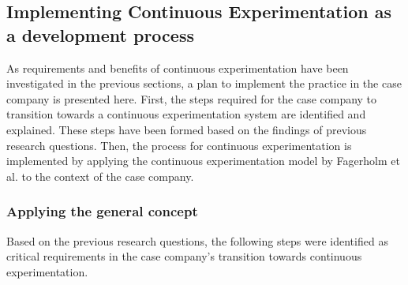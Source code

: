 \documentclass[english]{tktltiki2}
\theoremstyle{definition}
\theoremstyle{remark}
\begin{document}


\subsection{Implementing Continuous Experimentation as a development process}
As requirements and benefits of continuous experimentation have been investigated in the previous sections, a plan to implement the practice in the case company is presented here. First, the steps required for the case company to transition towards a continuous experimentation system are identified and explained. These steps have been formed based on the findings of previous research questions. Then, the process for continuous experimentation is implemented by applying the continuous experimentation model by Fagerholm et al. \cite{fagerholm2014building} to the context of the case company. 
\subsubsection{Applying the general concept}


Based on the previous research questions, the following steps were identified as critical requirements in the case company's transition towards continuous experimentation.
\end{document}
